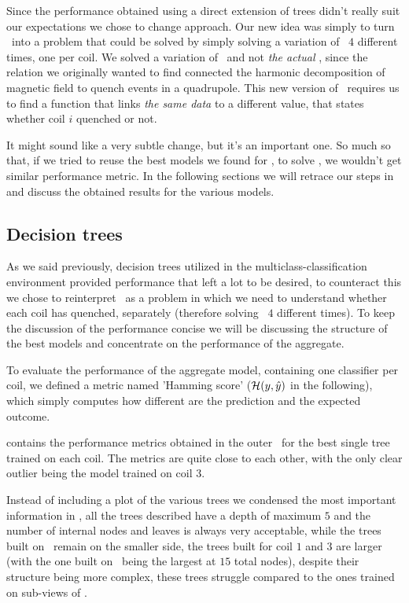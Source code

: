 Since the performance obtained using a direct extension of trees didn't really suit our expectations
we chose to change approach. Our new idea was simply to turn \qlp\ into a problem that could be
solved by simply solving a variation of \qrp\ $4$ different times, one per coil. We solved a
variation of \qrp\ and not \emph{the actual} \qrp, since the relation we originally wanted to find
connected the harmonic decomposition of magnetic field to quench events in a quadrupole. This new
version of \qrp\ requires us to find a function that links \emph{the same data} to a different
value, that states whether coil $i$ quenched or not.

It might sound like a very subtle change, but it's an important one. So much so that, if we tried to
reuse the best models we found for \qrp, to solve \qlp, we wouldn't get similar performance metric.
In the following sections we will retrace our steps in  and discuss the obtained
results for the various models.

\subsection{Decision trees}
As we said previously, decision trees utilized in the multiclass-classification environment provided
performance that left a lot to be desired, to counteract this we chose to reinterpret \qlp\ as a
problem in which we need to understand whether each coil has quenched, separately (therefore
solving \qrp\ $4$ different times). To keep the discussion of the performance concise we will be
discussing the structure of the best models and concentrate on the performance of the aggregate.

To evaluate the performance of the aggregate model, containing one classifier per coil, we defined a
metric named 'Hamming score' ($\mathcal{H}(y, \hat{y})$ in the following), which simply computes how different are the
prediction and the expected outcome.

 contains the performance metrics obtained in the outer \cv\ for the best single
tree trained on each coil. The metrics are quite close to each other, with the only clear outlier
being the model trained on coil $3$.

Instead of including a plot of the various trees we condensed the most important information
in , all the trees described have a depth of maximum $5$ and the number
of internal nodes and leaves is always very acceptable, while the trees built on \an\ remain on the
smaller side, the trees built for coil $1$ and $3$ are larger (with the one built on \cnmod\ being
the largest at $15$ total nodes), despite their structure being more complex, these trees struggle
compared to the ones trained on sub-views of \an.

